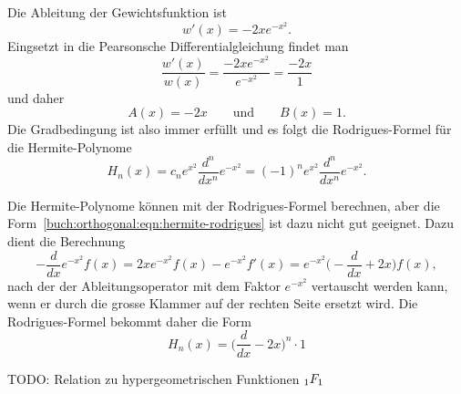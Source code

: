 Die Ableitung der Gewichtsfunktion ist
\[
w'(x) = -2xe^{-x^2}.
\]
Eingsetzt in die Pearsonsche Differentialgleichung findet man
\[
\frac{w'(x)}{w(x)}
=
\frac{-2xe^{-x^2}}{e^{-x^2}}
=
\frac{-2x}{1}
\]
und daher
\[
A(x) = -2x
\qquad\text{und}\qquad
B(x) = 1.
\]
Die Gradbedingung ist also immer erfüllt und es folgt die Rodrigues-Formel
für die Hermite-Polynome
\begin{equation}
H_n(x)
=
c_n
e^{x^2}\frac{d^n}{dx^n} e^{-x^2}
=
(-1)^n
e^{x^2}\frac{d^n}{dx^n} e^{-x^2}.
\label{buch:orthogonal:eqn:hermite-rodrigues}
\end{equation}

Die Hermite-Polynome können mit der Rodrigues-Formel berechnen, aber die 
Form~\eqref{buch:orthogonal:eqn:hermite-rodrigues} ist dazu nicht gut
geeignet.
Dazu dient die Berechnung 
\[
-\frac{d}{dx}
e^{-x^2}f(x)
=
2xe^{-x^2}f(x)
-
e^{-x^2}f'(x)
=
e^{-x^2}
\biggl(-\frac{d}{dx}+2x\biggr)
f(x),
\]
nach der der Ableitungsoperator mit dem Faktor $e^{-x^2}$ 
vertauscht werden kann, wenn er durch die grosse Klammer auf der
rechten Seite ersetzt wird.
Die Rodrigues-Formel bekommt daher die Form
\[
H_n(x) = \biggl(\frac{d}{dx}-2x\biggr)^n \cdot 1
\]

TODO: Relation zu hypergeometrischen Funktionen $\mathstrut_1F_1$


%
%
